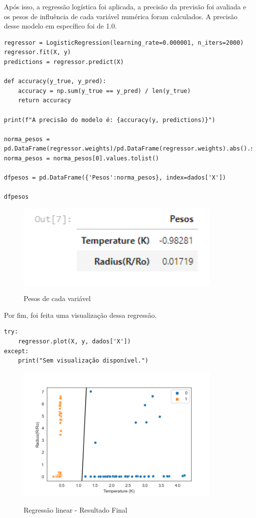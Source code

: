 \documentclass[12pt]{article}
\begin{document}
Após isso, a regressão logística foi aplicada, a precisão da previsão foi avaliada e os pesos de influência de cada variável numérica foram calculados. A precisão desse modelo em específico foi de 1.0.
\\
\begin{lstlisting}
regressor = LogisticRegression(learning_rate=0.000001, n_iters=2000)
regressor.fit(X, y)
predictions = regressor.predict(X)

def accuracy(y_true, y_pred):
    accuracy = np.sum(y_true == y_pred) / len(y_true)
    return accuracy

print(f"A precisão do modelo é: {accuracy(y, predictions)}")

norma_pesos = pd.DataFrame(regressor.weights)/pd.DataFrame(regressor.weights).abs().sum()
norma_pesos = norma_pesos[0].values.tolist()

dfpesos = pd.DataFrame({'Pesos':norma_pesos}, index=dados['X'])

dfpesos
\end{lstlisting}

\begin{figure}[h]
\caption{Pesos de cada variável}
\centering
\includegraphics[width=10cm]{out2.png}
\label{figura:out2}
\end{figure}

\vspace{240px}

Por fim, foi feita uma visualização dessa regressão.
\\
\begin{lstlisting}
try:
    regressor.plot(X, y, dados['X'])
except:
    print("Sem visualização disponível.")
\end{lstlisting}

\begin{figure}[h]
\caption{Regressão linear - Resultado Final}
\centering
\includegraphics[width=10cm]{teste.png}
\label{figura:regressao_linear}
\end{figure}
\end{document}
